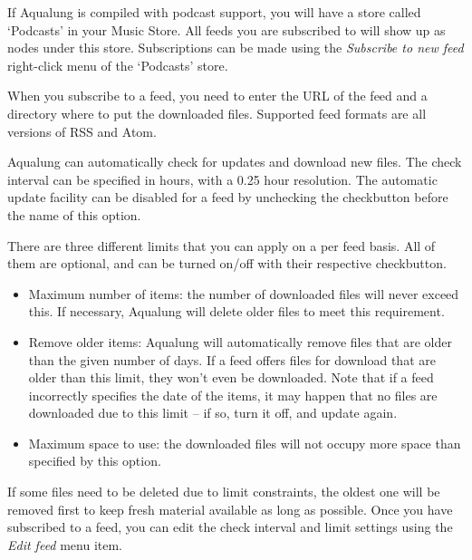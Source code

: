 \documentclass[10pt,english]{article}
\begin{document}
\noindent If Aqualung is compiled with podcast support, you will have a
store called `Podcasts' in your Music Store. All feeds you
are subscribed to will show up as nodes under this store.
Subscriptions can be made using the \textsl{Subscribe to new
feed} right-click menu of the `Podcasts' store.




When you subscribe to a feed, you need to enter the URL
of the feed and a directory where to put the downloaded
files. Supported feed formats are all versions of RSS and
Atom.




Aqualung can automatically check for updates and download
new files. The check interval can be specified in hours,
with a 0.25 hour resolution. The automatic update facility
can be disabled for a feed by unchecking the checkbutton
before the name of this option.




There are three different limits that you can apply on a
per feed basis. All of them are optional, and can be turned
on/off with their respective checkbutton.


\begin{itemize}

\item Maximum number of items: the number of downloaded
files will never exceed this. If necessary, Aqualung will
delete older files to meet this requirement.

\item Remove older items: Aqualung will automatically remove
files that are older than the given number of days. If a
feed offers files for download that are older than this
limit, they won't even be downloaded. Note that if a feed
incorrectly specifies the date of the items, it may happen
that no files are downloaded due to this limit -- if
so, turn it off, and update again.

\item Maximum space to use: the downloaded files will not
occupy more space than specified by this option.

\end{itemize}



\noindent If some files need to be deleted due to limit
constraints, the oldest one will be removed first to keep
fresh material available as long as possible. Once you have
subscribed to a feed, you can edit the check interval and
limit settings using the \textsl{Edit feed} menu
item.
\end{document}
